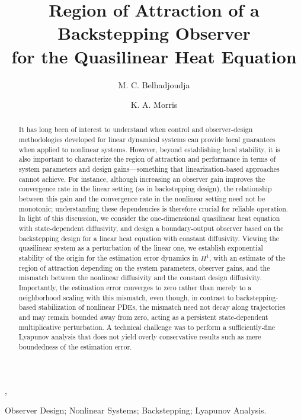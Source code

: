 \documentclass[twocolumn]{autart}
\begin{document}
\begin{frontmatter}
\title{Region of Attraction of a Backstepping Observer\\ for the Quasilinear Heat Equation} 

\author[UGA]{M. C. Belhadjoudja}, 
\author[WU]{K. A. Morris} 

\address[UGA]{Universit\'e Grenoble
Alpes, CNRS, Grenoble-INP, GIPSA-lab, F-38000, Grenoble, France}

\address[WU]{Department of Applied Mathematics, University of Waterloo, 200 University Avenue West, Waterloo, ON, Canada, N2L 3G1}

\begin{keyword}    
Observer Design; Nonlinear Systems; Backstepping; Lyapunov Analysis.
\end{keyword}

\begin{abstract}
It has long been of interest to understand when control and observer-design methodologies developed for linear dynamical systems can provide local guarantees when applied to nonlinear systems. However, beyond establishing local stability, it is also important to characterize the region of attraction and performance in terms of system parameters and design gains—something that linearization-based approaches cannot achieve. For instance, although increasing an observer gain improves the convergence rate in the linear setting (as in backstepping design), the relationship between this gain and the convergence rate in the nonlinear setting need not be monotonic; understanding these dependencies is therefore crucial for reliable operation. In light of this discussion, we consider the one-dimensional quasilinear heat equation with state-dependent diffusivity, and design a boundary-output observer based on the backstepping design for a linear heat equation with constant diffusivity. Viewing the quasilinear system as a perturbation of the linear one, we establish exponential stability of the origin for the estimation error dynamics in $H^1$, with an estimate of the region of attraction depending on the system parameters, observer gains, and the mismatch between the nonlinear diffusivity and the constant design diffusivity. Importantly, the estimation error converges to zero rather than merely to a neighborhood scaling with this mismatch, even though, in contrast to backstepping-based stabilization of nonlinear PDEs, the mismatch need not decay along trajectories and may remain bounded away from zero, acting as a persistent state-dependent multiplicative perturbation. A technical challenge was to perform a sufficiently-fine Lyapunov analysis that does not yield overly conservative results such as mere boundedness of the estimation error.
\end{abstract}

\end{frontmatter}
\end{document}
